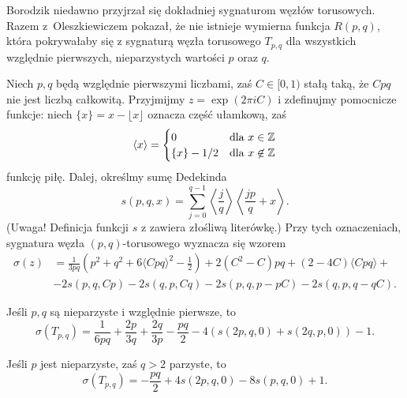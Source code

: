 Borodzik niedawno przyjrzał się dokładniej sygnaturom węzłów torusowych.
%
Razem z~Oleszkiewiczem \cite{borodzik2010} pokazał, że nie istnieje wymierna funkcja $R(p, q)$, która pokrywałaby się z sygnaturą węzła torusowego $T_{p, q}$ dla wszystkich względnie pierwszych, nieparzystych wartości $p$ oraz $q$.
%

\begin{proposition}
    Niech $p, q$ będą względnie pierwszymi liczbami, zaś $C \in [0, 1)$ stałą taką, że $Cpq$ nie jest liczbą całkowitą.
    Przyjmijmy $z = \exp (2 \pi i C)$ i zdefinujmy pomocnicze funkcje: niech $\{x\} = x - \lfloor x \rfloor$ oznacza część ułamkową, zaś
    \begin{equation}
        \langle x \rangle = \begin{cases}
            0 & \text{dla } x \in \mathbb Z \\
            \{x\} - 1/2 & \text{dla } x \not \in \mathbb Z
        \end{cases}
    \end{equation}
    funkcję piłę.
    Dalej, określmy sumę Dedekinda
    \begin{equation}
        s(p, q, x) = \sum_{j = 0}^{q-1} \left\langle \frac {j}{q} \right\rangle \left\langle \frac {jp}{q} + x \right\rangle.
    \end{equation}
    (Uwaga! Definicja funkcji $s$ z \cite{borodzik2010} zawiera złośliwą literówkę.)
    Przy tych oznaczeniach, sygnatura węzła $(p, q)$-torusowego wyznacza się wzorem
    \begin{align}
        \sigma(z) & = \frac{1}{3pq} \left(p^2 + q^2 + 6 \langle Cpq \rangle^2 - \frac {1}{2} \right)  + 2(C^2 - C) pq + (2-4C) \langle Cpq \rangle + {} \\
        & - 2s(p, q, Cp) - 2s(q, p, Cq) - 2s(p, q, p-pC) - 2s(q, p, q-qC). \nonumber
    \end{align}
\end{proposition}

\begin{corollary}
    Jeśli $p, q$ są nieparzyste i względnie pierwsze, to
    \begin{equation}
        \sigma(T_{p,q}) = \frac{1}{6pq} + \frac{2p}{3q} + \frac{2q}{3p} - \frac{pq}{2} - 4(s(2p, q, 0) + s(2q, p, 0)) - 1.
    \end{equation}
\end{corollary}

\begin{corollary}
    Jeśli $p$ jest nieparzyste, zaś $q > 2$ parzyste, to
    \begin{equation}
        \sigma(T_{p,q}) = - \frac{pq}{2} + 4s(2p, q, 0) - 8s(p, q, 0) + 1.
    \end{equation}
\end{corollary}

